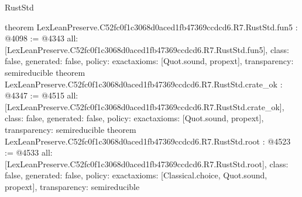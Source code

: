 \begin{lexlean}{RustStd}
\begin{coremodule}
{}
theorem LexLeanPreserve.C52fc0f1c3068d0aced1fb47369ccdcd6.R7.RustStd.fun5 : @4098 := @4343 {
  all: [LexLeanPreserve.C52fc0f1c3068d0aced1fb47369ccdcd6.R7.RustStd.fun5],
  class: false,
  generated: false,
  policy: exact{axioms: [Quot.sound, propext]},
  transparency: semireducible
}
theorem LexLeanPreserve.C52fc0f1c3068d0aced1fb47369ccdcd6.R7.RustStd.crate_ok : @4347 := @4515 {
  all: [LexLeanPreserve.C52fc0f1c3068d0aced1fb47369ccdcd6.R7.RustStd.crate_ok],
  class: false,
  generated: false,
  policy: exact{axioms: [Quot.sound, propext]},
  transparency: semireducible
}
theorem LexLeanPreserve.C52fc0f1c3068d0aced1fb47369ccdcd6.R7.RustStd.root : @4523 := @4533 {
  all: [LexLeanPreserve.C52fc0f1c3068d0aced1fb47369ccdcd6.R7.RustStd.root],
  class: false,
  generated: false,
  policy: exact{axioms: [Classical.choice, Quot.sound, propext]},
  transparency: semireducible
}


\end{coremodule}
\end{lexlean}
